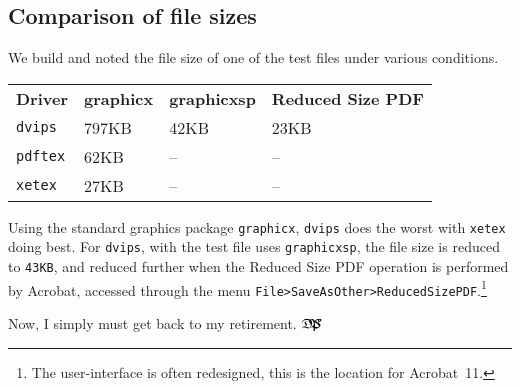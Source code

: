 \documentclass{article}
\def\dps{$\hbox{$\mathfrak D$\kern-.3em\hbox{$\mathfrak P$}%
   \kern-.6em \hbox{$\mathcal S$}}$}
\let\amtIndent\parindent %
\begin{document}
\subsection{Comparison of file sizes}

We build and noted the file size of one of the test files under various
conditions.
\begin{flushleft}
\hspace*{\amtIndent}\begin{tabular}{llll}
\textbf{Driver}&\textbf{graphicx}&\textbf{graphicxsp}&\textbf{Reduced Size PDF}\\
\texttt{dvips}&797KB&42KB&23KB\\
\texttt{pdftex}&62KB&--&--\\
\texttt{xetex}&27KB&--&--
\end{tabular}
\end{flushleft}
Using the standard graphics package \texttt{graphicx}, \texttt{dvips} does
the worst with \texttt{xetex} doing best. For \texttt{dvips}, with the
test file uses \texttt{graphicxsp}, the file size is reduced to
\texttt{43KB}, and reduced further when the Reduced Size PDF operation is
performed by Acrobat, accessed through the menu
\texttt{File\;>\;Save\;As\;Other\;>\;Reduced\;Size\;PDF}.\footnote{The user-interface is often redesigned, this is the location
for Acrobat~11.}



\newtopic\noindent
Now, I simply must get back to my retirement. \dps
\end{document}
